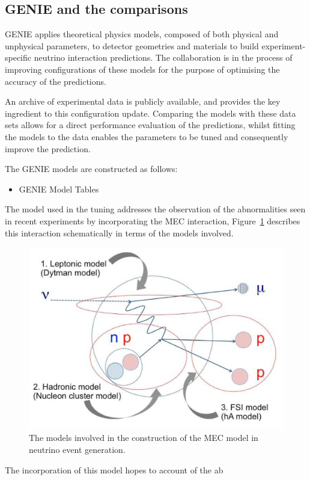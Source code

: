
\subsection{GENIE and the comparisons}
    GENIE applies theoretical physics models, composed of both physical and unphysical parameters, to detector geometries and materials to build experiment-specific neutrino interaction predictions. The collaboration is in the process of improving configurations of these models for the purpose of optimising the accuracy of the predictions.

    An archive of experimental data is publicly available, and provides the key ingredient to this configuration update. Comparing the models with these data sets allows for a direct performance evaluation of the predictions, whilst fitting the models to the data enables the parameters to be tuned and consequently improve the prediction.

The GENIE models are constructed as follows:

\begin{itemize}
    \item GENIE Model Tables
\end{itemize}

The model used in the tuning addresses the observation of the abnormalities seen in recent experiments by incorporating the MEC interaction, Figure~\ref{fig:MECSchem} describes this interaction schematically in terms of the models involved. 

\begin{figure}[h!]
    \centering
    \includegraphics[width=.6\textwidth]{images/mec_model_genie.png}
    \caption{The models involved in the construction of the MEC model in neutrino event generation.}
    \label{fig:MECSchem}
\end{figure}

The incorporation of this model hopes to account of the ab


